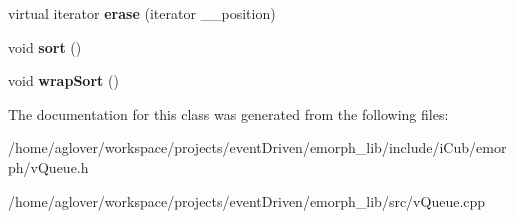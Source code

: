 \begin{DoxyCompactItemize}
\item 
\hypertarget{classemorph_1_1vQueue_ac8f2ae2f4c240a774ebfc31bea860817}{virtual iterator {\bfseries erase} (iterator \-\_\-\-\_\-position)}\label{classemorph_1_1vQueue_ac8f2ae2f4c240a774ebfc31bea860817}

\item 
\hypertarget{classemorph_1_1vQueue_abe1401ff2ff49bf3aa53c50ee9444c3e}{void {\bfseries sort} ()}\label{classemorph_1_1vQueue_abe1401ff2ff49bf3aa53c50ee9444c3e}

\item 
\hypertarget{classemorph_1_1vQueue_a995f8d91ead68c307b7d1ab706e03f2b}{void {\bfseries wrap\-Sort} ()}\label{classemorph_1_1vQueue_a995f8d91ead68c307b7d1ab706e03f2b}

\end{DoxyCompactItemize}


The documentation for this class was generated from the following files\-:\begin{DoxyCompactItemize}
\item 
/home/aglover/workspace/projects/event\-Driven/emorph\-\_\-lib/include/i\-Cub/emorph/v\-Queue.\-h\item 
/home/aglover/workspace/projects/event\-Driven/emorph\-\_\-lib/src/v\-Queue.\-cpp\end{DoxyCompactItemize}
